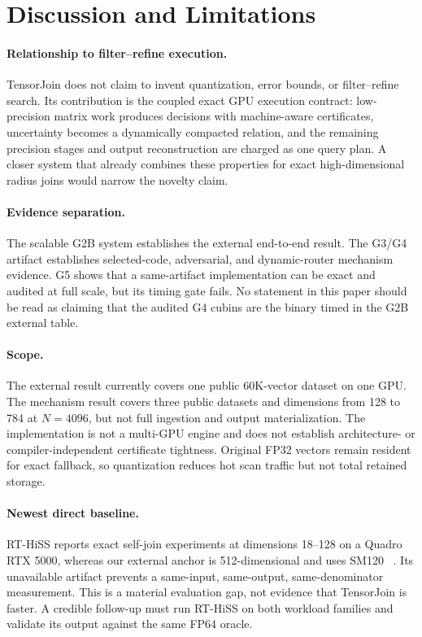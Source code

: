 \documentclass[sigconf,review,anonymous]{acmart}
\newcommand{\system}{TensorJoin\xspace}
\begin{document}
\section{Discussion and Limitations}

\paragraph{Relationship to filter--refine execution.}
\system does not claim to invent quantization, error bounds, or
filter--refine search.  Its contribution is the coupled exact GPU execution
contract: low-precision matrix work produces decisions with machine-aware
certificates, uncertainty becomes a dynamically compacted relation, and the
remaining precision stages and output reconstruction are charged as one query
plan.  A closer system that already combines these properties for exact
high-dimensional radius joins would narrow the novelty claim.

\paragraph{Evidence separation.}
The scalable G2B system establishes the external end-to-end result.  The
G3/G4 artifact establishes selected-code, adversarial, and dynamic-router
mechanism evidence.  G5 shows that a same-artifact implementation can be exact
and audited at full scale, but its timing gate fails.  No statement in this
paper should be read as claiming that the audited G4 cubins are the binary
timed in the G2B external table.

\paragraph{Scope.}
The external result currently covers one public 60K-vector dataset on one
GPU.  The mechanism result covers three public datasets and dimensions from
128 to 784 at $N=4096$, but not full ingestion and output materialization.
The implementation is not a multi-GPU engine and does not establish
architecture- or compiler-independent certificate tightness.  Original FP32
vectors remain resident for exact fallback, so quantization reduces hot scan
traffic but not total retained storage.

\paragraph{Newest direct baseline.}
RT-HiSS reports exact self-join experiments at dimensions 18--128 on a Quadro
RTX 5000, whereas our external anchor is 512-dimensional and uses SM120
~\cite{munugala2026rthiss}.  Its unavailable artifact prevents a same-input,
same-output, same-denominator measurement.  This is a material evaluation gap,
not evidence that \system is faster.  A credible follow-up must run RT-HiSS on
both workload families and validate its output against the same FP64 oracle.
\end{document}
